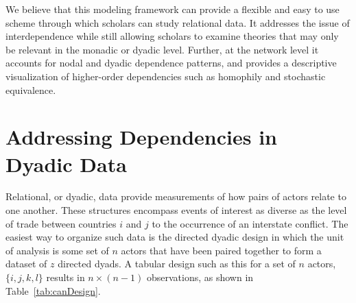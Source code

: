 \documentclass[12pt,onesided,pdflatex]{amsart}
\begin{document}
We believe that this modeling framework can provide a flexible and easy to use scheme through which scholars can study relational data. It addresses the issue of interdependence while still allowing scholars to examine theories that may only be relevant in the monadic or dyadic level. Further, at the network level it accounts for nodal and dyadic dependence patterns, and provides a descriptive visualization of higher-order dependencies such as homophily and stochastic equivalence. 


\section{\textbf{Addressing Dependencies in Dyadic Data}}

Relational, or dyadic, data provide measurements of how pairs of actors relate to one another. These structures encompass events of interest as diverse as the level of trade between countries $i$ and $j$ to the occurrence of an interstate conflict. The easiest way to organize such data is the directed dyadic design in which the unit of analysis is some set of $n$ actors that have been paired together to form a dataset of $z$ directed dyads. A tabular design such as this for a set of $n$ actors, $\{i, j, k, l \}$ results in $n \times (n-1)$ observations, as shown in Table~\ref{tab:canDesign}. 
\end{document}
